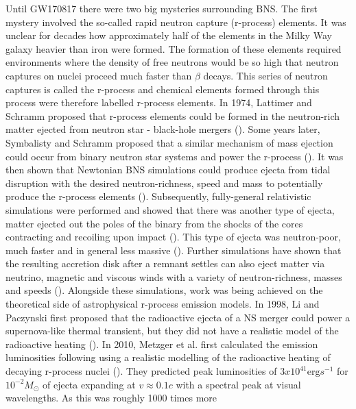 Until GW170817 there were two big mysteries surrounding BNS. The first mystery involved the so-called rapid neutron capture (r-process) elements. It was unclear for decades how approximately half of the elements in the Milky Way galaxy heavier than iron were formed. The formation of these elements required environments where the density of free neutrons would be so high that neutron captures on nuclei proceed much faster than $\beta$ decays. This series of neutron captures is called the r-process and chemical elements formed through this process were therefore labelled r-process elements. In 1974, Lattimer and Schramm proposed that r-process elements could be formed in the neutron-rich matter ejected from neutron star - black-hole mergers (\citet*{lattimer1974black}). Some years later, Symbalisty and Schramm proposed that a similar mechanism of mass ejection could occur from binary neutron star systems and power the r-process (\citet*{symbalisty1982neutron}). It was then shown that Newtonian BNS simulations could produce ejecta from tidal disruption with the desired neutron-richness, speed and mass to potentially produce the r-process elements (\citet*{davies1994merging, ruffert1996coalescing, rosswog1998mass, freiburghaus1999r}). Subsequently, fully-general relativistic simulations were performed and showed that there was another type of ejecta, matter ejected out the poles of the binary from the shocks of the cores contracting and recoiling upon impact (\citet*{oechslin2006torus,hotokezaka:13,sekiguchi2015dynamical,foucart2015low}). This type of ejecta was neutron-poor, much faster and in general less massive (\citet*{foucart2015low}). Further simulations have shown that the resulting accretion disk after a remnant settles can also eject matter via neutrino, magnetic and viscous winds with a variety of neutron-richness, masses and speeds (\citet*{fernandez2013}). Alongside these simulations, work was being achieved on the theoretical side of astrophysical r-process emission models. In 1998, Li and Paczynski first proposed that the radioactive ejecta of a NS merger could power a supernova-like thermal transient, but they did not have a realistic model of the radioactive heating (\citet*{li:1998bw}). In 2010, Metzger et al. first calculated the emission luminosities following using a realistic modelling of the radioactive heating of decaying r-process nuclei (\citet*{2010mnras.406.2650m}). They predicted peak luminosities of $3 x 10^{41} \text{erg} s^{-1}$ for $10^{-2}M_\odot$  of ejecta expanding at $v \approx 0.1 c$ with a spectral peak at visual wavelengths. As this was roughly 1000 times more
